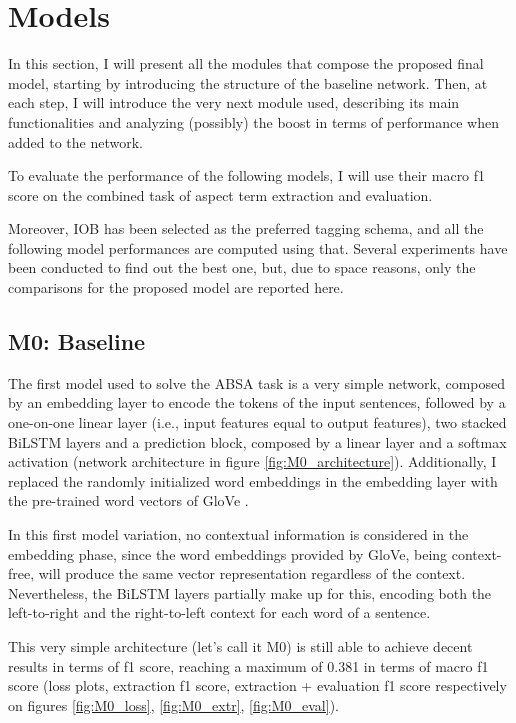 \documentclass[11pt,a4paper]{article}
\begin{document}
	\section{Models}
	In this section, I will present all the modules that compose the proposed final model, starting by introducing the structure of the baseline network. Then, at each step, I will introduce the very next module used, describing its main functionalities and analyzing (possibly) the boost in terms of performance when added to the network.
	
	To evaluate the performance of the following models, I will use their macro f1 score on the combined task of aspect term extraction and evaluation.
	
	Moreover, IOB has been selected as the preferred tagging schema, and all the following model performances are computed using that. Several experiments have been conducted to find out the best one, but, due to space reasons, only the comparisons for the proposed model are reported here.
	
	\subsection{M0: Baseline}
	The first model used to solve the ABSA task is a very simple network, composed by an embedding layer to encode the tokens of the input sentences, followed by a one-on-one linear layer (i.e., input features equal to output features), two stacked BiLSTM layers and a prediction block, composed by a linear layer and a softmax activation (network architecture in figure \ref{fig:M0_architecture}). Additionally, I replaced the randomly initialized word embeddings in the embedding layer with the pre-trained word vectors of GloVe \citep{pennington2014glove}.
	
	In this first model variation, no contextual information is considered in the embedding phase, since the word embeddings provided by GloVe, being context-free, will produce the same vector representation regardless of the context. Nevertheless, the BiLSTM layers partially make up for this, encoding both the left-to-right and the right-to-left context for each word of a sentence.
	
	This very simple architecture (let's call it M0) is still able to achieve decent results in terms of f1 score, reaching a maximum of 0.381 in terms of macro f1 score (loss plots, extraction f1 score, extraction + evaluation f1 score respectively on figures \ref{fig:M0_loss}, \ref{fig:M0_extr}, \ref{fig:M0_eval}).
	
\end{document}
